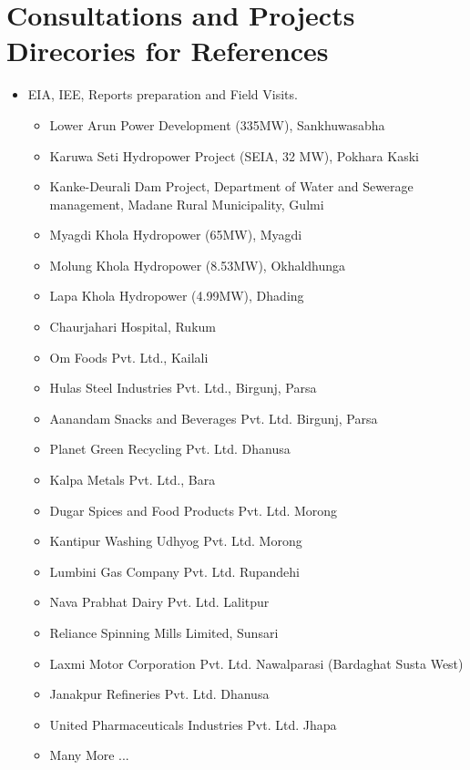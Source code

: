 \documentclass[a4paper, 09pt]{extarticle}
\begin{document}
\section*{Consultations and Projects Direcories for References}
\begin{itemize}
    \item EIA, IEE, Reports preparation and Field Visits.
    \begin{itemize}
        \item Lower Arun Power Development  (335MW), Sankhuwasabha
        \item Karuwa Seti Hydropower Project (SEIA, 32 MW), Pokhara Kaski
        \item Kanke-Deurali Dam Project, Department of Water and Sewerage management, Madane Rural Municipality, Gulmi
        \item Myagdi Khola Hydropower (65MW), Myagdi
        \item Molung Khola Hydropower (8.53MW), Okhaldhunga
        \item Lapa Khola Hydropower (4.99MW), Dhading
        \item Chaurjahari Hospital,  Rukum
        \item Om Foods Pvt. Ltd., Kailali
        \item Hulas Steel Industries Pvt. Ltd.,  Birgunj, Parsa
        \item Aanandam Snacks and Beverages Pvt. Ltd. Birgunj, Parsa
        \item Planet Green Recycling Pvt. Ltd. Dhanusa
        \item Kalpa Metals Pvt. Ltd.,  Bara 
        \item Dugar Spices and Food Products Pvt. Ltd. Morong
        \item Kantipur Washing Udhyog Pvt. Ltd. Morong
        \item Lumbini Gas Company Pvt. Ltd. Rupandehi
        \item Nava Prabhat Dairy Pvt. Ltd. Lalitpur
        \item Reliance Spinning Mills Limited, Sunsari
        \item Laxmi Motor Corporation Pvt. Ltd. Nawalparasi (Bardaghat Susta West)
        \item Janakpur Refineries Pvt. Ltd. Dhanusa
        \item United Pharmaceuticals Industries Pvt. Ltd. Jhapa
        \item Many More ...


\end{itemize}
\end{itemize}
\end{document}

